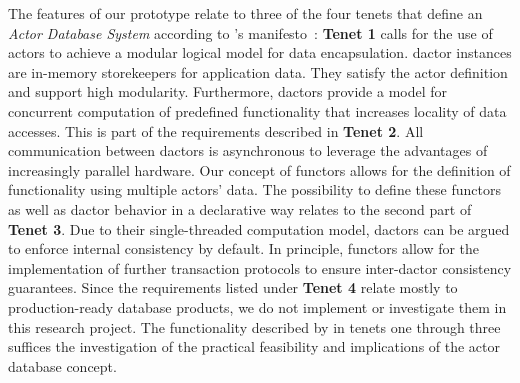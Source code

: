   The features of our prototype relate to three of the four tenets that define an \textit{Actor Database System} according to \citeauthor{manifesto}'s manifesto~\cite{manifesto}:
  \textbf{Tenet 1} calls for the use of actors to achieve a modular logical model for data encapsulation.
  \Gls{dactor} instances are in-memory storekeepers for application data.
  They satisfy the actor definition and support high modularity.
  Furthermore, \glspl{dactor} provide a model for concurrent computation of predefined functionality that increases locality of data accesses.
  This is part of the requirements described in \textbf{Tenet 2}.
  All communication between \glspl{dactor} is asynchronous to leverage the advantages of increasingly parallel hardware.
  Our concept of \glspl{functor} allows for the definition of functionality using multiple actors' data.
  The possibility to define these \glspl{functor} as well as \gls{dactor} behavior in a declarative way relates to the second part of \textbf{Tenet 3}.
  Due to their single-threaded computation model, \glspl{dactor} can be argued to enforce internal consistency by default.
  In principle, \glspl{functor} allow for the implementation of further transaction protocols to ensure inter-\gls{dactor} consistency guarantees.
  Since the requirements listed under \textbf{Tenet 4} relate mostly to production-ready database products, we do not implement or investigate them in this research project.
  The functionality described by \citeauthor{manifesto} in tenets one through three suffices the investigation of the practical feasibility and implications of the actor database concept.

